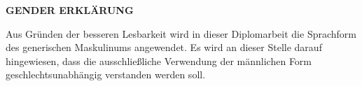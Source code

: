 \vspace*{4cm}

\begin{center}
\textbf{GENDER ERKLÄRUNG}
\end{center}
\begin{center}
\begin{minipage}[c]{9cm}
Aus Gründen der besseren Lesbarkeit wird in dieser Diplomarbeit die  Sprachform des generischen Maskulinums angewendet. Es wird an dieser Stelle darauf hingewiesen, dass die ausschließliche   Verwendung der männlichen Form geschlechtsunabhängig verstanden werden soll.   
\end{minipage}
\end{center}
